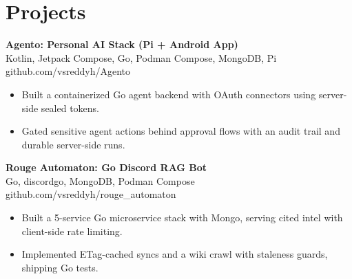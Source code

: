 \documentclass[a4paper,11pt]{article}
\newcommand{\resumeItem}[1]{\item \small{#1}}
\newcommand{\resumeSubheading}[4]{%
  \textbf{#1} \hfill \textbf{#2} \\
{#3} \hfill {#4}
}
\newcommand{\resumeSubHeadingListStart}{\begin{itemize}}
\newcommand{\resumeSubHeadingListEnd}{\end{itemize}}
\begin{document}
\section*{Projects}

\resumeSubheading
{Agento: Personal AI Stack (Pi + Android App)}{}{Kotlin, Jetpack Compose, Go, Podman Compose, MongoDB, Pi}{github.com/vsreddyh/Agento}
\resumeSubHeadingListStart
\resumeItem{Built a containerized Go agent backend with OAuth connectors using server-side sealed tokens.}
\resumeItem{Gated sensitive agent actions behind approval flows with an audit trail and durable server-side runs.}
\resumeSubHeadingListEnd

\resumeSubheading
{Rouge Automaton: Go Discord RAG Bot}{}{Go, discordgo, MongoDB, Podman Compose}{github.com/vsreddyh/rouge\_automaton}
\resumeSubHeadingListStart
\resumeItem{Built a 5-service Go microservice stack with Mongo, serving cited intel with client-side rate limiting.}
\resumeItem{Implemented ETag-cached syncs and a wiki crawl with staleness guards, shipping Go tests.}
\resumeSubHeadingListEnd


\vspace{-0.6em}
\end{document}
